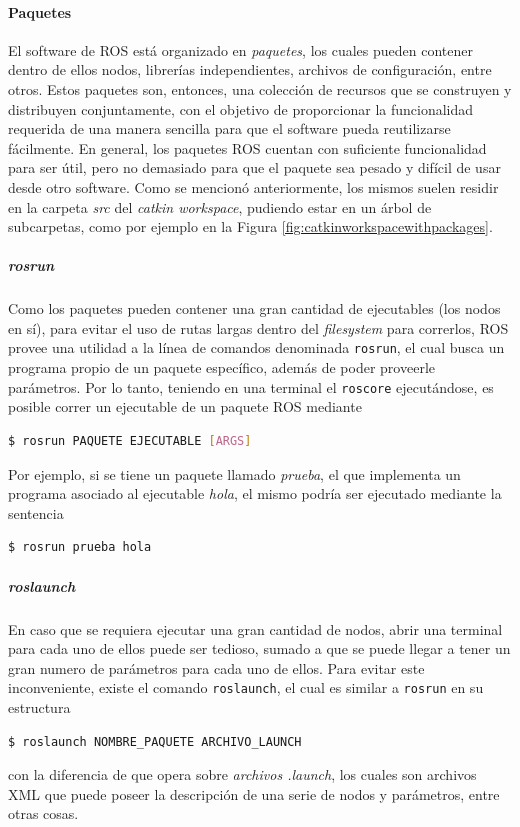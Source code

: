 \paragraph{Paquetes}
El software de ROS está organizado en \textit{paquetes}, los cuales pueden contener dentro de ellos nodos, librerías independientes, archivos de configuración, entre otros. Estos paquetes son, entonces, una colección de recursos que se construyen y distribuyen conjuntamente, con el objetivo de proporcionar la funcionalidad requerida de una manera sencilla para que el software pueda reutilizarse fácilmente. En general, los paquetes ROS cuentan con suficiente funcionalidad para ser útil, pero no demasiado para que el paquete sea pesado y difícil de usar desde otro software. Como se mencionó anteriormente, los mismos suelen residir en la carpeta \textit{src} del \textit{catkin workspace}, pudiendo estar en un árbol de subcarpetas, como por ejemplo en la Figura \ref{fig:catkinworkspacewithpackages}.


\subparagraph{rosrun}
Como los paquetes pueden contener una gran cantidad de ejecutables (los nodos en sí), para evitar el uso de rutas largas dentro del \textit{filesystem} para correrlos, ROS provee una utilidad a la línea de comandos denominada \texttt{rosrun}, el cual busca un programa propio de un paquete específico, además de poder proveerle parámetros. Por lo tanto, teniendo en una terminal el \texttt{roscore} ejecutándose, es posible correr un ejecutable de un paquete ROS mediante
\begin{lstlisting}[language=bash]
  $ rosrun PAQUETE EJECUTABLE [ARGS]
\end{lstlisting}

Por ejemplo, si se tiene un paquete llamado \textit{prueba}, el que implementa un programa asociado al ejecutable \textit{hola}, el mismo podría ser ejecutado mediante la sentencia
\begin{lstlisting}[language=bash]
  $ rosrun prueba hola
\end{lstlisting}

\subparagraph{roslaunch}
En caso que se requiera ejecutar una gran cantidad de nodos, abrir una terminal para cada uno de ellos puede ser tedioso, sumado a que se puede llegar a tener un gran numero de parámetros para cada uno de ellos. Para evitar este inconveniente, existe el comando \texttt{roslaunch}, el cual es similar a \texttt{rosrun} en su estructura
\begin{lstlisting}[language=bash]
  $ roslaunch NOMBRE_PAQUETE ARCHIVO_LAUNCH
\end{lstlisting}
con la diferencia de que opera sobre \textit{archivos .launch}, los cuales son archivos XML que puede poseer la descripción de una serie de nodos y parámetros, entre otras cosas.

